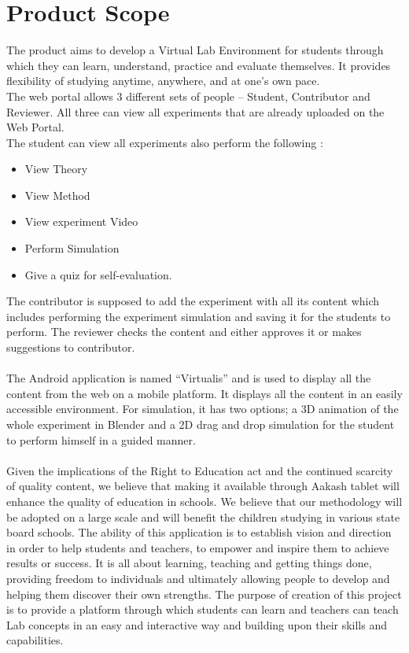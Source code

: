 \documentclass[12pt]{report}
\begin{document}
\section{Product Scope}
The product aims to develop a Virtual Lab Environment for students through which they can learn, understand, practice and evaluate themselves. It provides flexibility of studying anytime, anywhere, and at one's own pace.
\\

The web portal allows 3 different sets of people – Student, Contributor and Reviewer. All three can view all experiments that are already uploaded on the Web Portal. \\
The student can view all experiments also perform the following :
\begin{itemize}
\item View Theory
\item View Method
\item View experiment Video
\item Perform Simulation
\item Give a quiz for self-evaluation.
\end{itemize}

The contributor is supposed to add the experiment with all its content which includes performing the experiment simulation and saving it for the students to perform. The reviewer checks the content and either approves it or makes suggestions to contributor.
\\
\\
The Android application is named “Virtualis” and is used to display all the content from the web on a mobile platform. It displays all the content in an easily accessible environment. For simulation, it has two options; a 3D animation of the whole experiment in Blender and a 2D drag and drop simulation for the student to perform himself in a guided manner.
\\
\\
Given the implications of the Right to Education act and the continued scarcity of quality content, we believe that making it available through Aakash tablet will enhance the quality of education in schools. We believe that our methodology will be adopted on a large scale and will benefit the children studying in various state board schools. The ability of this application is to establish vision and direction in order to help students and teachers, to empower and inspire them to achieve results or success. It is all about learning, teaching and getting things done, providing freedom to individuals and ultimately allowing people to develop and helping them discover their own strengths. The purpose of creation of this project is to provide a platform through which students can learn and teachers can teach Lab concepts in an easy and interactive way and building upon their skills and capabilities.
\end{document}
